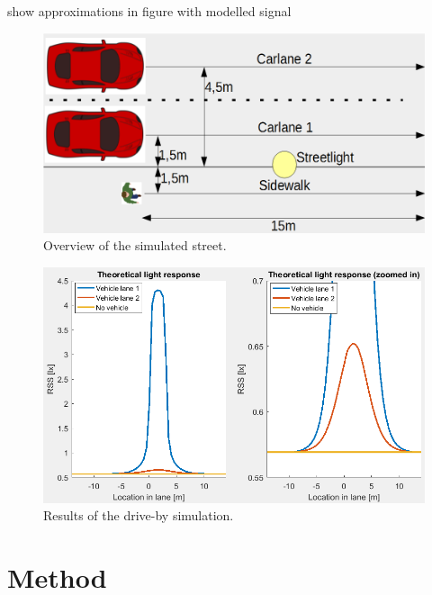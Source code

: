 show approximations in figure with modelled signal\\


\begin{figure}[!h]
	\includegraphics[width=\textwidth]{pics/streetlightoverview.png}
	\caption{Overview of the simulated street.}
	\label{fig:simulatedStreet}
\end{figure}

\begin{figure}[!h]
	\includegraphics[width=\textwidth]{pics/CarDriveBy.png}
	\caption{Results of the drive-by simulation.}
	\label{fig:CarDriveBy}
\end{figure}


\section{Method}
\label{sec:Method}


